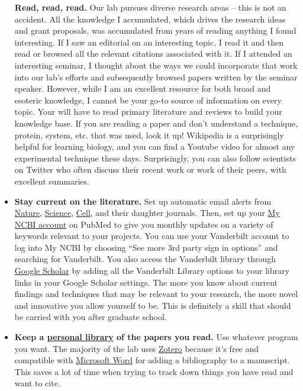 \documentclass[
]{book}
\begin{document}
\begin{itemize}
  \textbf{Read, read, read.} Our lab pursues diverse research areas -- this is not an accident. All the knowledge I accumulated, which drives the research ideas and grant proposals, was accumulated from years of reading anything I found interesting. If I saw an editorial on an interesting topic, I read it and then read or browsed all the relevant citations associated with it. If I attended an interesting seminar, I thought about the ways we could incorporate that work into our lab's efforts and subsequently browsed papers written by the seminar speaker. However, while I am an excellent resource for both broad and esoteric knowledge, I cannot be your go-to source of information on every topic. Your will have to read primary literature and reviews to build your knowledge base. If you are reading a paper and don't understand a technique, protein, system, etc. that was used, look it up! Wikipedia is a surprisingly helpful for learning biology, and you can find a Youtube video for almost any experimental technique these days. Surprisingly, you can also follow scientists on Twitter who often discuss their recent work or work of their peers, with excellent summaries.
\item
  \textbf{Stay current on the literature.} Set up automatic email alerts from \href{https://www.nature.com/}{Nature}, \href{https://www.sciencemag.org/}{Science}, \href{https://www.cell.com/}{Cell}, and their daughter journals. Then, set up your \href{https://www.ncbi.nlm.nih.gov/myncbi/}{My NCBI account} on PubMed to give you monthly updates on a variety of keywords relevant to your projects. You can use your Vanderbilt account to log into My NCBI by choosing ``See more 3rd party sign in options'' and searching for Vanderbilt. You also access the Vanderbilt library through \href{https://scholar.google.com/}{Google Scholar} by adding all the Vanderbilt Library options to your library links in your Google Scholar settings. The more you know about current findings and techniques that may be relevant to your research, the more novel and innovative you allow yourself to be. This is definitely a skill that should be carried with you after graduate school.
\item
  \textbf{Keep a \protect\hyperlink{zotero}{personal library} of the papers you read.} Use whatever program you want. The majority of the lab uses \href{https://www.zotero.org/}{Zotero} because it's free and compatible with \href{https://www.zotero.org/support/word_processor_integration}{Microsoft Word} for adding a bibliography to a manuscript. This saves a lot of time when trying to track down things you have read and want to cite.

\end{itemize}
\end{document}
